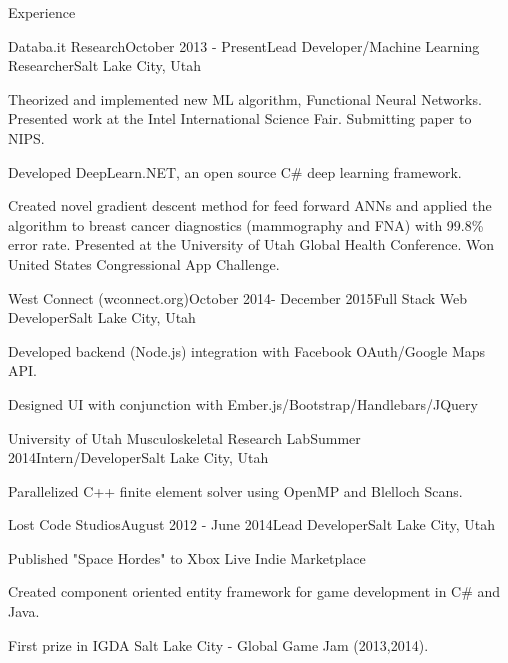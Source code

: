 \documentclass{resume} %
\begin{document}
\begin{rSection}{Experience}

\begin{rSubsection}{Databa.it Research}{October 2013 - Present}{Lead Developer/Machine Learning Researcher}{Salt Lake City, Utah}
\item Theorized and implemented new ML algorithm, Functional Neural Networks. Presented work at the Intel International Science Fair. Submitting paper to NIPS.
\item Developed DeepLearn.NET, an open source C\# deep learning framework.
\item Created novel gradient descent method for feed forward ANNs and applied the algorithm to breast cancer diagnostics (mammography and FNA) with 99.8\% error rate. Presented at the University of Utah Global Health Conference. Won United States Congressional App Challenge.  
\end{rSubsection}

\begin{rSubsection}{West Connect (wconnect.org)}{October 2014- December 2015}{Full Stack Web Developer}{Salt Lake City, Utah}
\item Developed backend (Node.js) integration with Facebook OAuth/Google Maps API.
\item Designed UI with conjunction with Ember.js/Bootstrap/Handlebars/JQuery
\end{rSubsection}

\begin{rSubsection}{University of Utah Musculoskeletal Research Lab}{Summer 2014}{Intern/Developer}{Salt Lake City, Utah}
\item Parallelized C++ finite element solver using OpenMP and Blelloch Scans.
\end{rSubsection}

\begin{rSubsection}{Lost Code Studios}{August 2012 - June 2014}{Lead Developer}{Salt Lake City, Utah}
\item Published "Space Hordes" to Xbox Live Indie Marketplace
\item Created component oriented entity framework for game development in C\# and Java.
\item First prize in IGDA Salt Lake City - Global Game Jam (2013,2014).
\end{rSubsection}





\end{rSection}
\end{document}
